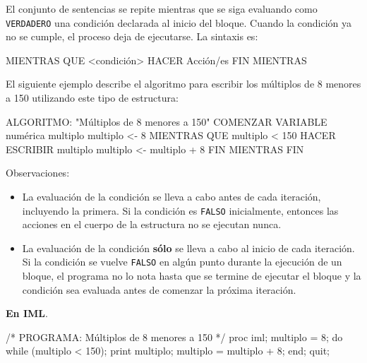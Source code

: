 \documentclass[
]{book}
\newenvironment{Shaded}{\begin{snugshade}}{\end{snugshade}}
\newcommand{\NormalTok}[1]{#1}
\providecommand{\tightlist}{%
  \setlength{\itemsep}{0pt}\setlength{\parskip}{0pt}}
\begin{document}
El conjunto de sentencias se repite mientras que se siga evaluando como \texttt{VERDADERO} una condición declarada al inicio del bloque. Cuando la condición ya no se cumple, el proceso deja de ejecutarse. La sintaxis es:

\begin{Shaded}
\begin{Highlighting}[]
\NormalTok{MIENTRAS QUE \textless{}condición\textgreater{} HACER}
\NormalTok{    Acción/es}
\NormalTok{FIN MIENTRAS}
\end{Highlighting}
\end{Shaded}

El siguiente ejemplo describe el algoritmo para escribir los múltiplos de 8 menores a 150 utilizando este tipo de estructura:

\begin{Shaded}
\begin{Highlighting}[]
\NormalTok{ALGORITMO: "Múltiplos de 8 menores a 150"}
\NormalTok{COMENZAR}
\NormalTok{    VARIABLE numérica multiplo}
\NormalTok{    multiplo \textless{}{-} 8}
\NormalTok{    MIENTRAS QUE multiplo \textless{} 150 HACER}
\NormalTok{        ESCRIBIR multiplo}
\NormalTok{        multiplo \textless{}{-} multiplo + 8}
\NormalTok{    FIN MIENTRAS}
\NormalTok{FIN}
\end{Highlighting}
\end{Shaded}

Observaciones:

\begin{itemize}
\tightlist
\item
  La evaluación de la condición se lleva a cabo antes de cada iteración, incluyendo la primera. Si la condición es \texttt{FALSO} inicialmente, entonces las acciones en el cuerpo de la estructura no se ejecutan nunca.
\item
  La evaluación de la condición \textbf{sólo} se lleva a cabo al inicio de cada iteración. Si la condición se vuelve \texttt{FALSO} en algún punto durante la ejecución de un bloque, el programa no lo nota hasta que se termine de ejecutar el bloque y la condición sea evaluada antes de comenzar la próxima iteración.
\end{itemize}

\textbf{En IML}.

\begin{Shaded}
\begin{Highlighting}[]
\NormalTok{/* PROGRAMA: Múltiplos de 8 menores a 150 */}
\NormalTok{proc iml;}
\NormalTok{    multiplo = 8;}
\NormalTok{    do while (multiplo \textless{} 150);}
\NormalTok{        print multiplo;}
\NormalTok{        multiplo = multiplo + 8;}
\NormalTok{    end;}
\NormalTok{quit;}
\end{Highlighting}
\end{Shaded}
\end{document}
